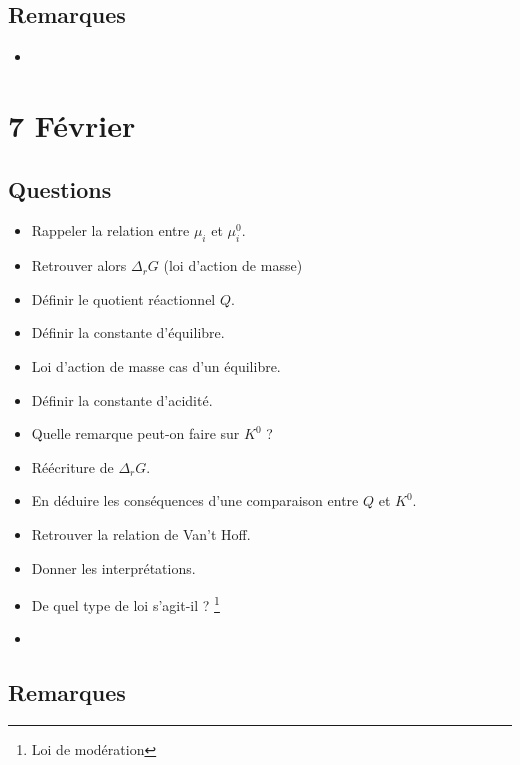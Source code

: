 \documentclass[a4paper, 11pt, hidelinks]{article}
\begin{document}
\subsection{Remarques}



\begin{itemize}
    \item 
\end{itemize}





\section{7 Février}

\subsection{Questions}



\begin{itemize}
    \item Rappeler la relation entre $\mu_i$ et $\mu_i^0$. \cite{Chapitre3bis}
    \item Retrouver alors $\Delta_r G$ (loi d'action de masse) \cite{Chapitre3bis}
    \item Définir le quotient réactionnel $Q$.\cite{Chapitre3bis}
    \item Définir la constante d'équilibre. \cite{Chapitre3bis}
    \item Loi d'action de masse cas d'un équilibre. \cite{Chapitre3bis}
    \item Définir la constante d'acidité. \cite{Chapitre3bis}
    \item Quelle remarque peut-on faire sur $K^0$ ? \cite{Chapitre3bis}
    \item Réécriture de $\Delta_r G$. \cite{Chapitre3bis}
    \item En déduire les conséquences d'une comparaison entre $Q$ et $K^0$. \cite{Chapitre3bis}
    \item Retrouver la relation de Van't Hoff. \cite{Chapitre3bis}
    \item Donner les interprétations. \cite{Chapitre3bis}
    \item De quel type de loi s'agit-il ? \footnote{Loi de modération} \cite{Chapitre3bis}
    \item 
\end{itemize}


\subsection{Remarques}
\end{document}
